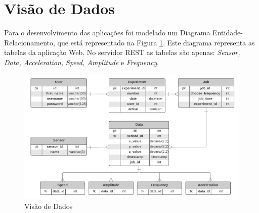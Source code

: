     
\section*{Visão de Dados}

Para o desenvolvimento das aplicações foi modelado um Diagrama Entidade-Relacionamento, que está representado na Figura \ref{fig:visao_de_dados}.
Este diagrama representa as tabelas da aplicação Web. No servidor REST as tabelas são apenas: \textit{Sensor, Data, Acceleration,
Speed, Amplitude} e \textit{Frequency}.

\begin{figure}[!ht]
\centering
\includegraphics[keepaspectratio=true,scale=0.7]{figuras/visao_de_dados.png}
\caption{Visão de Dados}
\label{fig:visao_de_dados} 
\end{figure} 

    